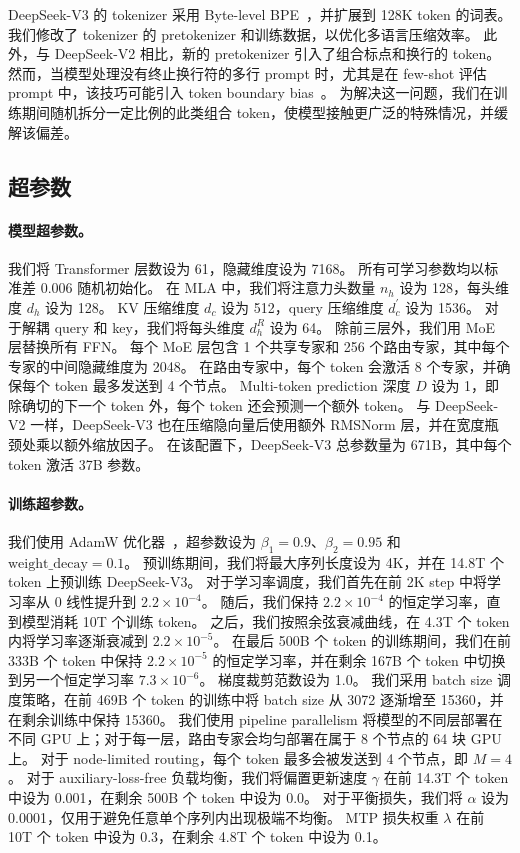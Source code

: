 \documentclass[11pt, a4paper, logo, copyright, nonumbering]{deepseek}
\newcommand{\dsvii}{DeepSeek-V2}
\newcommand{\dsattn}{MLA}
\newcommand{\dsviii}{DeepSeek-V3}
\begin{document}
\dsviii{} 的 tokenizer 采用 Byte-level BPE~\citep{shibata1999byte}，并扩展到 128K token 的词表。
我们修改了 tokenizer 的 pretokenizer 和训练数据，以优化多语言压缩效率。
此外，与 \dsvii{} 相比，新的 pretokenizer 引入了组合标点和换行的 token。
然而，当模型处理没有终止换行符的多行 prompt 时，尤其是在 few-shot 评估 prompt 中，该技巧可能引入 token boundary bias~\citep{tokenboundary}。
为解决这一问题，我们在训练期间随机拆分一定比例的此类组合 token，使模型接触更广泛的特殊情况，并缓解该偏差。

\subsection{超参数}

\paragraph{模型超参数。}
我们将 Transformer 层数设为 61，隐藏维度设为 7168。
所有可学习参数均以标准差 0.006 随机初始化。
在 \dsattn{} 中，我们将注意力头数量 $n_h$ 设为 128，每头维度 $d_h$ 设为 128。
KV 压缩维度 $d_c$ 设为 512，query 压缩维度 $d_c^{\prime}$ 设为 1536。
对于解耦 query 和 key，我们将每头维度 $d_h^R$ 设为 64。
除前三层外，我们用 MoE 层替换所有 FFN。
每个 MoE 层包含 1 个共享专家和 256 个路由专家，其中每个专家的中间隐藏维度为 2048。
在路由专家中，每个 token 会激活 8 个专家，并确保每个 token 最多发送到 4 个节点。
Multi-token prediction 深度 $D$ 设为 1，即除确切的下一个 token 外，每个 token 还会预测一个额外 token。
与 \dsvii{} 一样，\dsviii{} 也在压缩隐向量后使用额外 RMSNorm 层，并在宽度瓶颈处乘以额外缩放因子。
在该配置下，\dsviii{} 总参数量为 671B，其中每个 token 激活 37B 参数。

\paragraph{训练超参数。}
我们使用 AdamW 优化器~\citep{adamW}，超参数设为 $\beta_1=0.9$、$\beta_2=0.95$ 和 $\mathrm{weight\_decay}=0.1$。
预训练期间，我们将最大序列长度设为 4K，并在 14.8T 个 token 上预训练 \dsviii{}。
对于学习率调度，我们首先在前 2K step 中将学习率从 0 线性提升到 $2.2 \times 10^{-4}$。
随后，我们保持 $2.2 \times 10^{-4}$ 的恒定学习率，直到模型消耗 10T 个训练 token。
之后，我们按照余弦衰减曲线，在 4.3T 个 token 内将学习率逐渐衰减到 $2.2 \times 10^{-5}$。
在最后 500B 个 token 的训练期间，我们在前 333B 个 token 中保持 $2.2 \times 10^{-5}$ 的恒定学习率，并在剩余 167B 个 token 中切换到另一个恒定学习率 $7.3 \times 10^{-6}$。
梯度裁剪范数设为 1.0。
我们采用 batch size 调度策略，在前 469B 个 token 的训练中将 batch size 从 3072 逐渐增至 15360，并在剩余训练中保持 15360。
我们使用 pipeline parallelism 将模型的不同层部署在不同 GPU 上；对于每一层，路由专家会均匀部署在属于 8 个节点的 64 块 GPU 上。
对于 node-limited routing，每个 token 最多会被发送到 4 个节点，即 $M=4$。
对于 auxiliary-loss-free 负载均衡，我们将偏置更新速度 $\gamma$ 在前 14.3T 个 token 中设为 0.001，在剩余 500B 个 token 中设为 0.0。
对于平衡损失，我们将 $\alpha$ 设为 0.0001，仅用于避免任意单个序列内出现极端不均衡。
MTP 损失权重 $\lambda$ 在前 10T 个 token 中设为 0.3，在剩余 4.8T 个 token 中设为 0.1。
\end{document}
